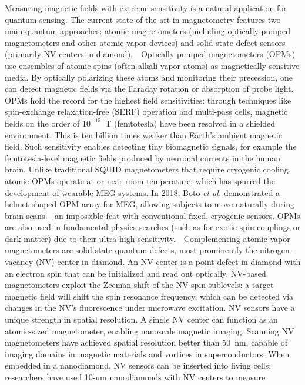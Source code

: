 \documentclass[12pt]{article}
\begin{document}
Measuring magnetic fields with extreme sensitivity is a natural
application for quantum sensing. The current state-of-the-art in
magnetometry features two main quantum approaches: atomic
magnetometers (including optically pumped magnetometers and other
atomic vapor devices) and solid-state defect sensors (primarily NV
centers in diamond).    Optically pumped magnetometers (OPMs) use
ensembles of atomic spins (often alkali vapor atoms) as magnetically
sensitive media. By optically polarizing these atoms and monitoring
their precession, one can detect magnetic fields via the Faraday
rotation or absorption of probe light. OPMs hold the record for the
highest field sensitivities: through techniques like spin-exchange
relaxation-free (SERF) operation and multi-pass cells, magnetic fields
on the order of $10^{-15}$~T (femtotesla) have been resolved in a
shielded environment\cite{Budker2007}. This is ten billion times
weaker than Earth’s ambient magnetic field. Such sensitivity enables
detecting tiny biomagnetic signals, for example the femtotesla-level
magnetic fields produced by neuronal currents in the human
brain. Unlike traditional SQUID magnetometers that require cryogenic
cooling, atomic OPMs operate at or near room temperature, which has
spurred the development of wearable MEG systems. In 2018, Boto
\textit{et al.} demonstrated a helmet-shaped OPM array for MEG,
allowing subjects to move naturally during brain scans – an impossible
feat with conventional fixed, cryogenic sensors. OPMs are also used in
fundamental physics searches (such as for exotic spin couplings or
dark matter) due to their ultra-high sensitivity.    Complementing
atomic vapor magnetometers are solid-state quantum defects, most
prominently the nitrogen-vacancy (NV) center in diamond. An NV center
is a point defect in diamond with an electron spin that can be
initialized and read out optically. NV-based magnetometers exploit the
Zeeman shift of the NV spin sublevels: a target magnetic field will
shift the spin resonance frequency, which can be detected via changes
in the NV’s fluorescence under microwave excitation. NV sensors have a
unique strength in spatial resolution. A single NV center can function
as an atomic-sized magnetometer, enabling nanoscale magnetic
imaging. Scanning NV magnetometers have achieved spatial resolution
better than 50~nm, capable of imaging domains in magnetic materials
and vortices in superconductors\cite{Schirhagl2014}. When embedded in
a nanodiamond, NV sensors can be inserted into living cells;
researchers have used 10-nm nanodiamonds with NV centers to measure
\end{document}
